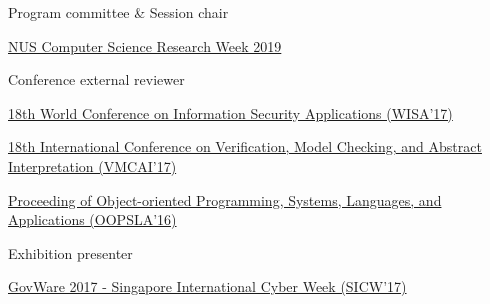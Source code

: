 

\begin{cventries}
  \cventry
    {Program committee \& Session chair} %
    {}
    {}
    {}
    {
      \begin{cvitems} %
        \item \href{http://researchweek.comp.nus.edu.sg/}{NUS Computer Science Research Week 2019}
      \end{cvitems}
    }

  \cventry
    {Conference external reviewer} %
    {}
    {}
    {}
    {
      \begin{cvitems} %
        \item \href{http://www.wisa.or.kr/}{18th World Conference on Information Security Applications (WISA'17)}
        \item \href{http://conf.researchr.org/home/VMCAI-2017}{18th International Conference on Verification, Model Checking, and Abstract Interpretation (VMCAI'17)}
        \item \href{http://2016.splashcon.org/track/splash-2016-oopsla}{Proceeding of Object-oriented Programming, Systems, Languages, and Applications (OOPSLA'16)}
      \end{cvitems}
    }
    \cventry
    {Exhibition presenter} %
    {}
    {}
    {}
    {
      \begin{cvitems} %
        \item \href{https://www.sicw.sg/2017/}{GovWare 2017 - Singapore International Cyber Week (SICW'17)}
      \end{cvitems}
    }
    
\end{cventries}



